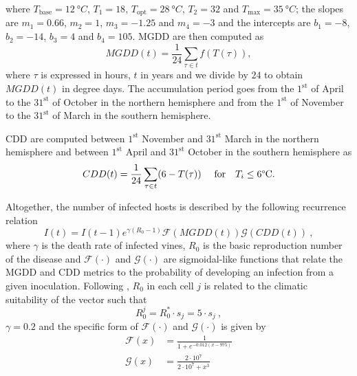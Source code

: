 where $T_{\textrm{base}}=\SI{12}{\degree C}$, $T_1=18$,
$T_{\textrm{opt}}=\SI{28}{\degree C}$,	$T_2=32$ and
$T_{\textrm{max}}=\SI{35}{\degree C}$; the slopes are $m_1= 0.66$, $m_2=1$,
$m_3=-1.25$ and $m_4=-3$ and the intercepts are $b_1=-8$, $b_2=-14$, $b_3=4$
and $b_4=105$. MGDD are then computed as
\begin{equation}\label{eq:MGDDdef}
    MGDD(t) = \frac{1}{24}\sum_{\tau \in t} f(T(\tau)),
\end{equation}
where $\tau$ is expressed in hours, $t$ in years and we divide by $24$ to
obtain $MGDD(t)$ in degree days. The accumulation period goes from the
$1^{\mathrm{st}}$ of April to the $31^{\mathrm{st}}$ of October in the northern
hemisphere and from the $1^{\mathrm{st}}$ of November to the $31^{\mathrm{st}}$
of March in the southern hemisphere.

CDD are computed between $1^{\mathrm{st}}$ November and $31^{\mathrm{st}}$
March in the northern hemisphere and between $1^{\mathrm{st}}$ April and
$31^{\mathrm{st}}$ October in the southern hemisphere as
\begin{equation}
    CDD(t)= \frac{1}{24}\sum_{\tau \in t} (6-T(\tau)) \ \quad \textrm{for}
    \quad T_i\le 6\textrm{\textdegree C} .	\label{eq:CDDdef}
\end{equation}

Altogether, the number of infected hosts is described by the following
recurrence relation
\begin{equation}
    I(t)=I(t-1)e^{\gamma(R_0-1)}\mathcal{F}(MGDD(t))\mathcal{G}(CDD(t)) \ ,
\end{equation}
where $\gamma$ is the death rate of infected vines, $R_0$ is the basic
reproduction number of the disease and $\mathcal{F}(\cdot)$ and
$\mathcal{G}(\cdot)$ are sigmoidal-like functions that relate the MGDD and CDD
metrics to the probability of developing an infection from a given inoculation.
Following \cite{GimenezRomero2022_CommsBio}, $R_0$ in each cell $j$ is related
to the
climatic suitability of the vector such that
\begin{equation}
    R_0^j=R_0^*\cdot s_j=5\cdot s_j \ ,
\end{equation}
$\gamma=0.2$ and the specific form of $\mathcal{F}(\cdot)$ and
$\mathcal{G}(\cdot)$ is given by
\begin{align}
    \mathcal{F}(x) & = \frac{1}{1+e^{-0.012(x-975)}}        \\
    \mathcal{G}(x) & = \frac{2\cdot10^7}{2\cdot 10^7 + x^3}
\end{align}

